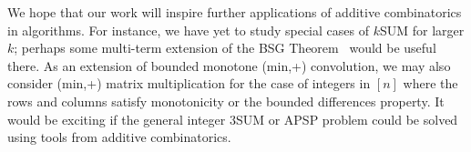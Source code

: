 \documentclass[11pt]{article}
\begin{document}
{We hope that our work will inspire further applications of additive combinatorics in algorithms.
For instance, we have yet to study special cases of $k$SUM for
larger $k$;
perhaps some multi-term extension of the BSG Theorem~\cite{BC} would be
useful there.  As an extension of bounded monotone (min,+)
convolution, we may also consider (min,+) matrix
multiplication for the case of integers in $[n]$ where the
rows and columns satisfy monotonicity or the bounded differences
property.
It would be exciting if the general integer 3SUM or APSP
problem could be solved using tools from
additive combinatorics.

}


\end{document}
